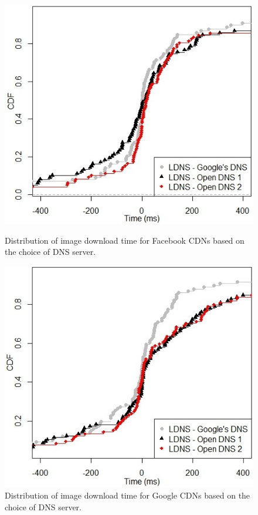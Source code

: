 \documentclass{llncs}
\begin{document}
\begin{figure}
  \includegraphics[width=\linewidth]{figures/dns_selection_avg_download_time_facebook}
  \caption{Distribution of image download time for Facebook CDNs based on the choice of DNS server.}
  \label{fig:dns_selection_avg_download_time_facebook}
\endminipage\hfill
{}%
  \includegraphics[width=\linewidth]{figures/dns_selection_avg_download_time_google}
  \caption{Distribution of image download time for Google CDNs based on the choice of DNS server.}
  \label{fig:dns_selection_avg_download_time_google}
\endminipage
\end{figure}
\end{document}
